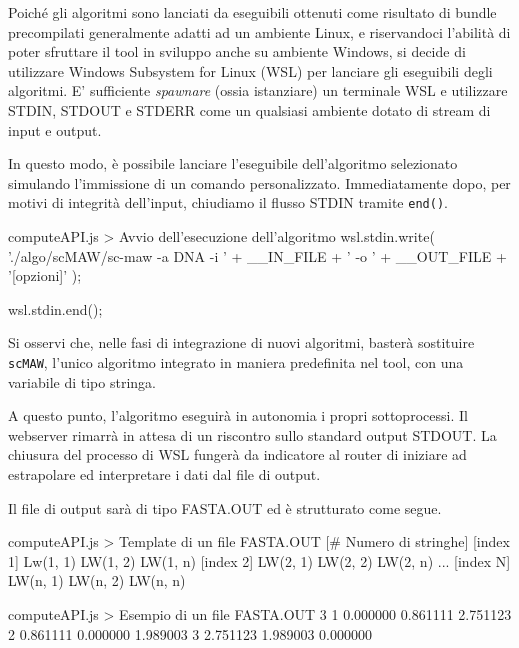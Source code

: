 Poiché gli algoritmi sono lanciati da eseguibili ottenuti come risultato di bundle precompilati generalmente adatti ad un ambiente Linux, e riservandoci l'abilità di poter sfruttare il tool in sviluppo anche su ambiente Windows, si decide di utilizzare Windows Subsystem for Linux (WSL) per lanciare gli eseguibili degli algoritmi. E' sufficiente \textit{spawnare} (ossia istanziare) un terminale WSL e utilizzare STDIN, STDOUT e STDERR come un qualsiasi ambiente dotato di stream di input e output.

In questo modo, è possibile lanciare l'eseguibile dell'algoritmo selezionato simulando l'immissione di un comando personalizzato. Immediatamente dopo, per motivi di integrità dell'input, chiudiamo il flusso STDIN tramite \verb|end()|.

\begin{sexylisting}{computeAPI.js > Avvio dell'esecuzione dell'algoritmo}
wsl.stdin.write(
	'./algo/scMAW/sc-maw -a DNA -i ' +
	__IN_FILE +
	' -o ' +
	__OUT_FILE +
	'[opzioni]'
);

wsl.stdin.end();
\end{sexylisting}

Si osservi che, nelle fasi di integrazione di nuovi algoritmi, basterà sostituire \verb|scMAW|, l'unico algoritmo integrato in maniera predefinita nel tool, con una variabile di tipo stringa.

\vspace{3mm}

A questo punto, l'algoritmo eseguirà in autonomia i propri sottoprocessi. Il webserver rimarrà in attesa di un riscontro sullo standard output STDOUT. La chiusura del processo di WSL fungerà da indicatore al router di iniziare ad estrapolare ed interpretare i dati dal file di output.

\vspace{3mm}

Il file di output sarà di tipo FASTA.OUT ed è strutturato come segue.

\begin{sexylisting}{computeAPI.js > Template di un file FASTA.OUT}
[# Numero di stringhe]
[index 1]	 Lw(1, 1)   LW(1, 2)    LW(1, n)
[index 2]	 LW(2, 1)   LW(2, 2)    LW(2, n)
...	
[index N]	LW(n, 1)    LW(n, 2)    LW(n, n)
\end{sexylisting}

\begin{sexylisting}{computeAPI.js > Esempio di un file FASTA.OUT}
3
1	0.000000	0.861111	2.751123	
2	0.861111	0.000000	1.989003	
3	2.751123	1.989003	0.000000
\end{sexylisting}

